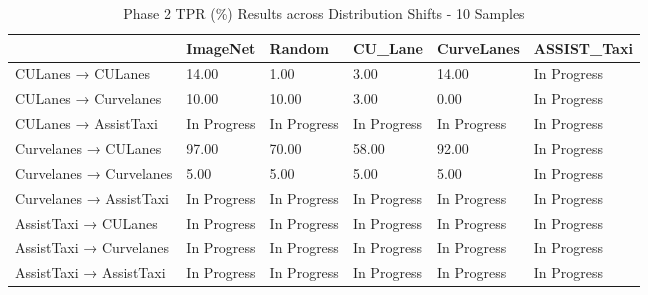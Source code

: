 \begin{table}
\caption{Phase 2 TPR (\%) Results across Distribution Shifts - 10 Samples}
\label{tab:phase2_tpr_10}
\begin{tabular}{llllll}
\toprule
 & ImageNet & Random & CU_Lane & CurveLanes & ASSIST_Taxi \\
\midrule
CULanes → CULanes & 14.00 & 1.00 & 3.00 & 14.00 & In Progress \\
CULanes → Curvelanes & 10.00 & 10.00 & 3.00 & 0.00 & In Progress \\
CULanes → AssistTaxi & In Progress & In Progress & In Progress & In Progress & In Progress \\
Curvelanes → CULanes & 97.00 & 70.00 & 58.00 & 92.00 & In Progress \\
Curvelanes → Curvelanes & 5.00 & 5.00 & 5.00 & 5.00 & In Progress \\
Curvelanes → AssistTaxi & In Progress & In Progress & In Progress & In Progress & In Progress \\
AssistTaxi → CULanes & In Progress & In Progress & In Progress & In Progress & In Progress \\
AssistTaxi → Curvelanes & In Progress & In Progress & In Progress & In Progress & In Progress \\
AssistTaxi → AssistTaxi & In Progress & In Progress & In Progress & In Progress & In Progress \\
\bottomrule
\end{tabular}
\end{table}
